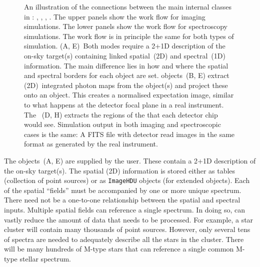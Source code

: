 \begin{figure}

\caption{An illustration of the connections between the main internal classes in \ScopeSim{}: \Source{}, \FieldOfView{}, \ImagePlane{}, \DetectorArray{}.
The upper panels show the work flow for imaging simulations.
The lower panels show the work flow for spectroscopy simulations.
The work flow is in principle the same for both types of simulation.
(A, E)~Both modes require a 2+1D description of the on-sky target(s) containing linked spatial~(2D) and spectral~(1D) information.
The main difference lies in how and where the spatial and spectral borders for each \FieldOfView{} object are set.
\FieldOfView{} objects~(B, E) extract (2D)~integrated photon maps from the \Source{} object(s) and project these onto an \ImagePlane{} object.
This creates a normalised expectation image, similar to what happens at the detector focal plane in a real instrument.
The \DetectorArray{}~(D, H) extracts the regions of the \ImagePlane{} that each detector chip would see.
Simulation output in both imaging and spectroscopic cases is the same: A FITS file with detector read images in the same format as generated by the real instrument.}
\label{fig:workflow}

\end{figure}

The \Source{} objects~(A, E) are supplied by the user.
These contain a 2+1D description of the on-sky target(s).
The spatial (2D) information is stored either as tables (collection of point sources) or as \lstinline{ImageHDU} objects (for extended objects).
Each of the spatial ``fields'' must be accompanied by one or more unique spectrum.
There need not be a one-to-one relationship between the spatial and spectral inputs.
Multiple spatial fields can reference a single spectrum.
In doing so, \ScopeSim{} can vastly reduce the amount of data that needs to be processed.
For example, a star cluster will contain many thousands of point sources.
However, only several tens of spectra are needed to adequately describe all the stars in the cluster.
There will be many hundreds of M-type stars that can reference a single common M-type stellar spectrum.

